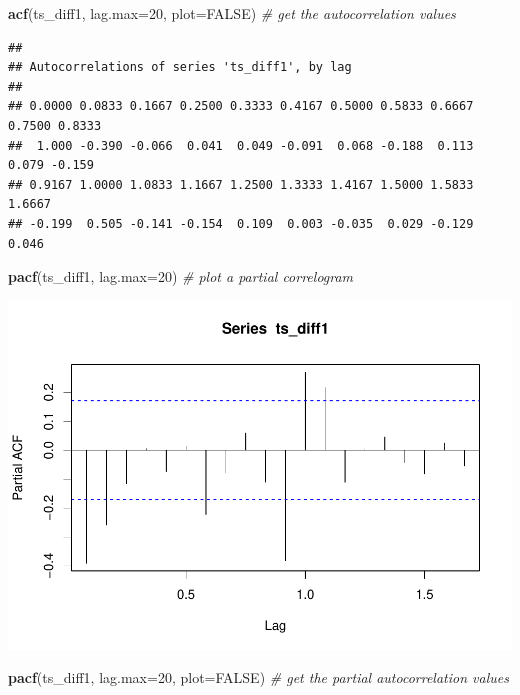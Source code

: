 \documentclass[
]{article}
\newenvironment{Shaded}{\begin{snugshade}}{\end{snugshade}}
\newcommand{\CommentTok}[1]{\textcolor[rgb]{0.56,0.35,0.01}{\textit{#1}}}
\newcommand{\DataTypeTok}[1]{\textcolor[rgb]{0.13,0.29,0.53}{#1}}
\newcommand{\DecValTok}[1]{\textcolor[rgb]{0.00,0.00,0.81}{#1}}
\newcommand{\KeywordTok}[1]{\textcolor[rgb]{0.13,0.29,0.53}{\textbf{#1}}}
\newcommand{\NormalTok}[1]{#1}
\newcommand{\OtherTok}[1]{\textcolor[rgb]{0.56,0.35,0.01}{#1}}
\begin{document}
\begin{Shaded}
\begin{Highlighting}[]
\KeywordTok{acf}\NormalTok{(ts_diff1, }\DataTypeTok{lag.max=}\DecValTok{20}\NormalTok{, }\DataTypeTok{plot=}\OtherTok{FALSE}\NormalTok{) }\CommentTok{# get the autocorrelation values}
\end{Highlighting}
\end{Shaded}

\begin{verbatim}
## 
## Autocorrelations of series 'ts_diff1', by lag
## 
## 0.0000 0.0833 0.1667 0.2500 0.3333 0.4167 0.5000 0.5833 0.6667 0.7500 0.8333 
##  1.000 -0.390 -0.066  0.041  0.049 -0.091  0.068 -0.188  0.113  0.079 -0.159 
## 0.9167 1.0000 1.0833 1.1667 1.2500 1.3333 1.4167 1.5000 1.5833 1.6667 
## -0.199  0.505 -0.141 -0.154  0.109  0.003 -0.035  0.029 -0.129  0.046
\end{verbatim}

\begin{Shaded}
\begin{Highlighting}[]
\KeywordTok{pacf}\NormalTok{(ts_diff1, }\DataTypeTok{lag.max=}\DecValTok{20}\NormalTok{)             }\CommentTok{# plot a partial correlogram}
\end{Highlighting}
\end{Shaded}

\includegraphics{tsf_export_files/figure-latex/unnamed-chunk-23-1.pdf}

\begin{Shaded}
\begin{Highlighting}[]
\KeywordTok{pacf}\NormalTok{(ts_diff1, }\DataTypeTok{lag.max=}\DecValTok{20}\NormalTok{, }\DataTypeTok{plot=}\OtherTok{FALSE}\NormalTok{) }\CommentTok{# get the partial autocorrelation values}
\end{Highlighting}
\end{Shaded}
\end{document}
